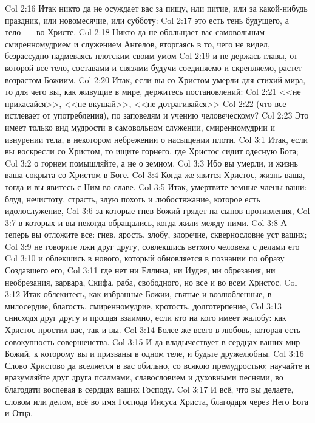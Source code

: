 \rsbpar\vs Col 2:16 Итак никто да не осуждает вас за пищу, или питие, или за какой-нибудь праздник, или новомесячие, или субботу:
\vs Col 2:17 это есть тень будущего, а тело~--- во Христе.
\vs Col 2:18 Никто да не обольщает вас самовольным смиренномудрием и служением Ангелов, вторгаясь в то, чего не видел, безрассудно надмеваясь плотским своим умом
\vs Col 2:19 и не держась главы, от которой все тело, составами и связями будучи соединяемо и скрепляемо, растет возрастом Божиим.
\vs Col 2:20 Итак, если вы со Христом умерли для стихий мира, то для чего вы, как живущие в мире, держитесь постановлений:
\vs Col 2:21 <<не прикасайся>>, <<не вкушай>>, <<не дотрагивайся>>
\vs Col 2:22 (что все истлевает от употребления), по заповедям и учению человеческому?
\vs Col 2:23 Это имеет только вид мудрости в самовольном служении, смиренномудрии и изнурении тела, в некотором небрежении о насыщении плоти.
\vs Col 3:1 Итак, если вы воскресли со Христом, то ищите горнего, где Христос сидит одесную Бога;
\vs Col 3:2 о горнем помышляйте, а не о земном.
\vs Col 3:3 Ибо вы умерли, и жизнь ваша сокрыта со Христом в Боге.
\vs Col 3:4 Когда же явится Христос, жизнь ваша, тогда и вы явитесь с Ним во славе.
\rsbpar\vs Col 3:5 Итак, умертвите земные члены ваши: блуд, нечистоту, страсть, злую похоть и любостяжание, которое есть идолослужение,
\vs Col 3:6 за которые гнев Божий грядет на сынов противления,
\vs Col 3:7 в которых и вы некогда обращались, когда жили между ними.
\vs Col 3:8 А теперь вы отложите все: гнев, ярость, злобу, злоречие, сквернословие уст ваших;
\vs Col 3:9 не говорите лжи друг другу, совлекшись ветхого человека с делами его
\vs Col 3:10 и облекшись в нового, который обновляется в познании по образу Создавшего его,
\vs Col 3:11 где нет ни Еллина, ни Иудея, ни обрезания, ни необрезания, варвара, Скифа, раба, свободного, но все и во всем Христос.
\rsbpar\vs Col 3:12 Итак облекитесь, как избранные Божии, святые и возлюбленные, в милосердие, благость, смиренномудрие, кротость, долготерпение,
\vs Col 3:13 снисходя друг другу и прощая взаимно, если кто на кого имеет жалобу: как Христос простил вас, так и вы.
\vs Col 3:14 Более же всего  в любовь, которая есть совокупность совершенства.
\vs Col 3:15 И да владычествует в сердцах ваших мир Божий, к которому вы и призваны в одном теле, и будьте дружелюбны.
\vs Col 3:16 Слово Христово да вселяется в вас обильно, со всякою премудростью; научайте и вразумляйте друг друга псалмами, славословием и духовными песнями, во благодати воспевая в сердцах ваших Господу.
\vs Col 3:17 И всё, что вы делаете, словом или делом, всё  во имя Господа Иисуса Христа, благодаря через Него Бога и Отца.
